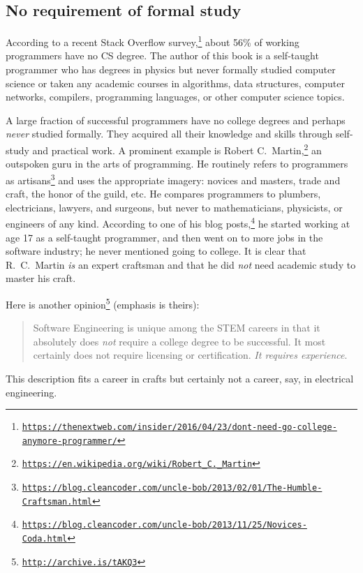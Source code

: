 \subsection{No requirement of formal study }

According to a recent Stack Overflow survey,\footnote{\texttt{\href{https://thenextweb.com/insider/2016/04/23/dont-need-go-college-anymore-programmer/}{https://thenextweb.com/insider/2016/04/23/dont-need-go-college-anymore-programmer/}}}
about 56\% of working programmers have no CS degree. The author of
this book is a self-taught programmer who has degrees in physics but
never formally studied computer science or taken any academic courses
in algorithms, data structures, computer networks, compilers, programming
languages, or other computer science topics. 

A large fraction of successful programmers have no college degrees
and perhaps \emph{never} studied formally. They acquired all their
knowledge and skills through self-study and practical work. A prominent
example is Robert C.~Martin,\footnote{\texttt{\href{https://en.wikipedia.org/wiki/Robert_C._Martin}{https://en.wikipedia.org/wiki/Robert\_C.\_Martin}}}
an outspoken guru in the arts of programming. He routinely refers
to programmers as artisans\footnote{\texttt{\href{https://blog.cleancoder.com/uncle-bob/2013/02/01/The-Humble-Craftsman.html}{https://blog.cleancoder.com/uncle-bob/2013/02/01/The-Humble-Craftsman.html}}}
and uses the appropriate imagery: novices and masters, trade and craft,
the honor of the guild, etc. He compares programmers to plumbers,
electricians, lawyers, and surgeons, but never to mathematicians,
physicists, or engineers of any kind. According to one of his blog
posts,\footnote{\texttt{\href{https://blog.cleancoder.com/uncle-bob/2013/11/25/Novices-Coda.html}{https://blog.cleancoder.com/uncle-bob/2013/11/25/Novices-Coda.html}}}
he started working at age 17 as a self-taught programmer, and then
went on to more jobs in the software industry; he never mentioned
going to college. It is clear that R.~C.~Martin \emph{is} an expert
craftsman and that he did \emph{not} need academic study to master
his craft.

Here is another opinion\footnote{\texttt{\href{http://archive.is/tAKQ3}{http://archive.is/tAKQ3}}}
(emphasis is theirs):
\begin{quotation}
{\small{}Software Engineering is unique among the STEM careers in
that it absolutely does }\emph{\small{}not}{\small{} require a college
degree to be successful. It most certainly does not require licensing
or certification. }\emph{\small{}It requires experience}{\small{}.}{\small\par}
\end{quotation}
This description fits a career in crafts \textemdash{} but certainly
not a career, say, in electrical engineering.

